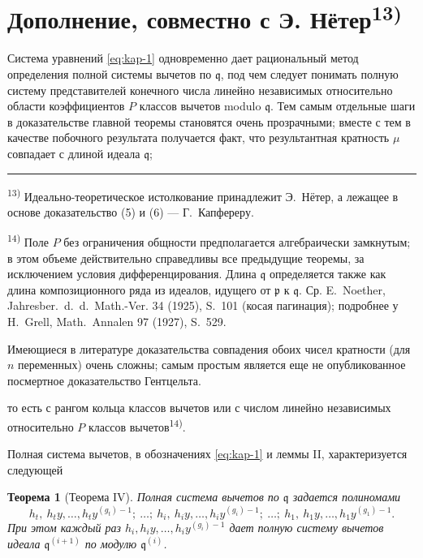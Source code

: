 \documentclass[11pt]{article}
\newcommand{\foreign}[1]{#1}
\theoremstyle{plain}
\newtheorem{satz}{Теорема}
\begin{document}
\newpage
\section*{Дополнение, совместно с Э. Нётер\textsuperscript{13)}}

Система уравнений \eqref{eq:kap-1} одновременно дает рациональный
метод определения полной системы вычетов по $\mathfrak{q}$, под чем
следует понимать полную систему представителей конечного числа
линейно независимых относительно области коэффициентов $P$ классов
вычетов modulo $\mathfrak{q}$. Тем самым отдельные шаги в
доказательстве главной теоремы становятся очень прозрачными; вместе
с тем в качестве побочного результата получается факт, что
результантная кратность $\mu$ совпадает с длиной идеала
$\mathfrak{q}$;

\vspace{0.5em}
\noindent\rule{\textwidth}{0.4pt}
\vspace{0.3em}

{\footnotesize
\textsuperscript{13)} Идеально-теоретическое истолкование принадлежит
Э.\ Нётер, а лежащее в основе доказательство (5) и (6) --- Г.\ Капфереру.

\textsuperscript{14)} Поле $P$ без ограничения общности предполагается
алгебраически замкнутым; в этом объеме действительно справедливы все
предыдущие теоремы, за исключением условия дифференцирования. Длина
$\mathfrak{q}$ определяется также как длина композиционного ряда из
идеалов, идущего от $\mathfrak{p}$ к $\mathfrak{q}$. Ср. E.\ Noether,
\foreign{Jahresber.\ d.\ d.\ Math.-Ver.} 34 (1925), S.~101
(косая пагинация); подробнее у H.\ Grell, \foreign{Math.\ Annalen} 97
(1927), S.~529.

Имеющиеся в литературе доказательства совпадения обоих чисел
кратности (для $n$ переменных) очень сложны; самым простым является
еще не опубликованное посмертное доказательство Гентцельта.
}

\vspace{1em}
то есть с рангом кольца классов вычетов или с числом линейно
независимых относительно $P$ классов вычетов\textsuperscript{14)}.

Полная система вычетов, в обозначениях \eqref{eq:kap-1} и леммы II,
характеризуется следующей

\begin{satz}[Теорема IV]\label{satz:kap-IV}
Полная система вычетов по $\mathfrak{q}$ задается полиномами
\[
h_{t},\ h_{t}y,\ldots,h_{t}y^{(g_{t})-1};\ \ldots;\
h_{i},\ h_{i}y,\ldots,h_{i}y^{(g_{i})-1};\ \ldots;\
h_{1},\ h_{1}y,\ldots,h_{1}y^{(g_{1})-1}.
\]
При этом каждый раз $h_{i}, h_{i}y, \ldots, h_{i}y^{(g_{i})-1}$ дает
полную систему вычетов идеала $\mathfrak{q}^{(i+1)}$ по модулю
$\mathfrak{q}^{(i)}$.
\end{satz}
\end{document}
